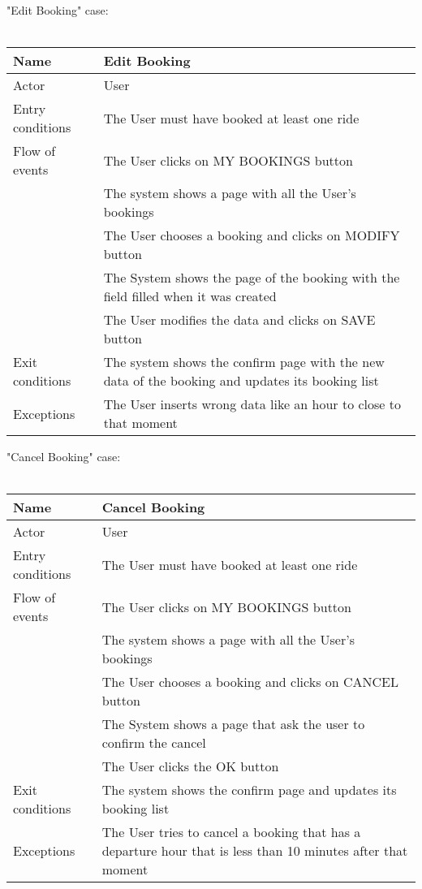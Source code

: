 \newpage
"Edit Booking" case:
\\
\\
\begin{tabular}{|l|p{10cm}|} 
\hline
Name & Edit Booking\\
\hline
Actor & User\\
\hline
Entry conditions & The User must have booked at least one ride\\
\hline
Flow of events
			&	\tabitem The User clicks on MY BOOKINGS button\\
			&	\tabitem The system shows a page with all the User's bookings\\
			&	\tabitem The User chooses a booking and clicks on MODIFY button\\
			&	\tabitem The System shows the page of the booking with the field filled when it was created\\
			&	\tabitem The User modifies the data and clicks on SAVE button\\
			
\hline
Exit conditions & The system shows the confirm page with the new data of the booking and updates its booking list\\
\hline
Exceptions & The User inserts wrong data like an hour to close to that moment\\
\hline
\end {tabular}

\newpage
"Cancel Booking" case:
\\
\\
\begin{tabular}{|l|p{10cm}|} 
\hline
Name & Cancel Booking\\
\hline
Actor & User\\
\hline
Entry conditions & The User must have booked at least one ride\\
\hline
Flow of events
			&	\tabitem The User clicks on MY BOOKINGS button\\
			&	\tabitem The system shows a page with all the User's bookings\\
			&	\tabitem The User chooses a booking and clicks on CANCEL button\\
			&	\tabitem The System shows a page that ask the user to confirm the cancel \askpippo\\
			&	\tabitem The User clicks the OK button\\	
\hline
Exit conditions & The system shows the confirm page and updates its booking list\\
\hline
Exceptions & The User tries to cancel a booking that has a departure hour that is less than 10 minutes after that moment\\
\hline
\end {tabular}

